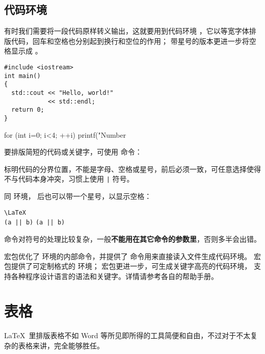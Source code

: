 \subsection{代码环境}\label{subsec:verbatim}

有时我们需要将一段代码原样转义输出，这就要用到代码环境 ，它以等宽字体排版代码，回车和空格也分别起到换行和空位的作用；
带星号的版本更进一步将空格显示成 \textvisiblespace 。
\begin{example}
\begin{verbatim}
#include <iostream>
int main()
{
  std::cout << "Hello, world!"
            << std::endl;
  return 0;
}
\end{verbatim}
\end{example}

\begin{example}
\begin{verbatim*}
for (int i=0; i<4; ++i)
  printf("Number %d\n",i);
\end{verbatim*}
\end{example}

要排版简短的代码或关键字，可使用  命令：
\begin{command}
\end{command}

 标明代码的分界位置，不能是字母、空格或星号，前后必须一致，可任意选择使得不与代码本身冲突，习惯上使用 \texttt| 符号。

同  环境， 后也可以带一个星号，以显示空格：
\begin{example}
\verb|\LaTeX| \\
\verb+(a || b)+ \verb*+(a || b)+
\end{example}

 命令对符号的处理比较复杂，一般\textbf{不能用在其它命令的参数里}，否则多半会出错。

 宏包优化了  环境的内部命令，并提供了  命令用来直接读入文件生成代码环境。
 宏包提供了可定制格式的  环境； 宏包更进一步，可生成关键字高亮的代码环境，
支持各种程序设计语言的语法和关键字。详情请参考各自的帮助手册。

\section{表格}\label{sec:tabular}

\LaTeX\ 里排版表格不如 Word 等所见即所得的工具简便和自由，不过对于不太复杂的表格来讲，完全能够胜任。

